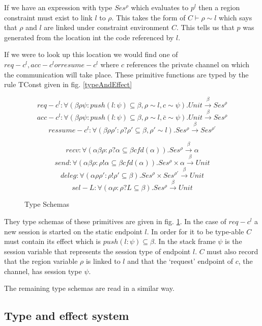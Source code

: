 If we have an expression with type $Ses^\rho$ which evaluates to $p^l$ then a region constraint must exist to link $l$ to $\rho$. This takes the form of $C\vdash \rho  \sim l$ which says that $\rho$ and $l$ are linked under constraint environment $C$. This tells us that $p$ was generated from the location int the code referenced by $l$.

If we were to look up this location we would find one of $req-c^l, acc-c^l or resume-c^l$ where $c$ references the private channel on which the communication will take place. These primitive functions are typed by the rule TConst given in fig. \ref{typeAndEffect}

\begin{figure}
$$req-c^l :  \forall(\beta \rho \psi:push(l:\psi) \subseteq \beta, \rho \sim l, c \sim \psi).Unit  \overset{\beta}{\rightarrow} Ses^\rho$$
$$acc-c^l :  \forall(\beta \rho \psi:push(l:\psi) \subseteq \beta, \rho \sim l, \bar{c} \sim \psi).Unit  \overset{\beta}{\rightarrow} Ses^\rho$$
$$ressume-c^l :  \forall(\beta \rho \rho':\rho ? \rho' \subseteq \beta, \rho' \sim l).Ses^{\rho}  \overset{\beta}{\rightarrow} Ses^{\rho'}$$


$$recv : \forall(\alpha \beta \rho : \rho ? \alpha \subseteq \beta cfd(\alpha)).Ses^{\rho} \overset{\beta}{\rightarrow} \alpha$$
$$send : \forall(\alpha \beta \rho : \rho ! \alpha \subseteq \beta cfd(\alpha)).Ses^{\rho} \times \alpha \overset{\beta}{\rightarrow} Unit$$
$$deleg : \forall(\alpha \rho \rho' : \rho ! \rho' \subseteq \beta ).Ses^{\rho} \times Ses^{\rho'} \overset{\beta}{\rightarrow} Unit$$
$$sel-L : \forall(\alpha \rho : \rho ? L \subseteq \beta ).Ses^{\rho}  \overset{\beta}{\rightarrow} Unit$$
\caption{Type Schemas}
\label{ts}
\end{figure}

They type schemas of these primitives are given in fig. \ref{ts}. In the case of $req-c^l$ a new session is started on the static endpoint $l$. In order for it to be type-able $C$ must contain its effect which is $push(l:\psi) \subseteq \beta$. In the stack frame $\psi$ is the session variable that represents the session type of endpoint $l$. $C$ must also record that the region variable $\rho$ is linked to $l$ and that the `request' endpoint of $c$, the channel, has session type $\psi$. 

The remaining type schemas are read in a similar way. 


\subsection{Type and effect system} 

